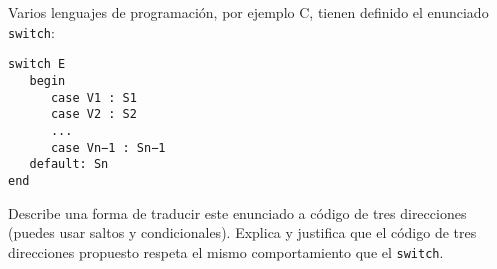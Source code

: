 Varios lenguajes de programaci\'on, por ejemplo \textsc{C}, tienen 
definido el enunciado \texttt{switch}:
\begin{verbatim}
switch E
   begin
      case V1 : S1
      case V2 : S2
      ...
      case Vn−1 : Sn−1
   default: Sn
end
\end{verbatim}
Describe una forma de traducir este enunciado a c\'odigo de tres direcciones 
(puedes usar saltos y condicionales).
Explica y justifica que el c\'odigo de tres direcciones propuesto respeta el 
mismo comportamiento que el \texttt{switch}.
